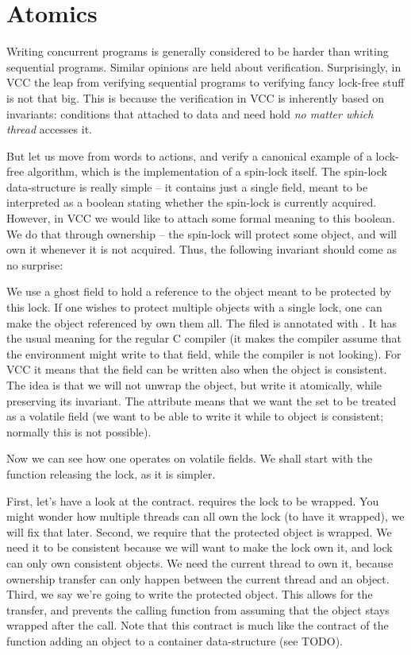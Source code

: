 \section{Atomics}

Writing concurrent programs is generally considered to be harder than writing
sequential programs.
Similar opinions are held about verification.
Surprisingly, in VCC the leap from verifying sequential programs to
verifying fancy lock-free stuff is not that big.
This is because the verification in VCC is inherently based on invariants:
conditions that attached to data and need hold \emph{no matter which thread}
accesses it.

But let us move from words to actions, and verify a canonical example
of a lock-free algorithm, which is the implementation of a spin-lock itself.
The spin-lock data-structure is really simple -- it contains just a single
field, meant to be interpreted as a boolean stating whether the spin-lock
is currently acquired.
However, in VCC we would like to attach some formal meaning to this boolean.
We do that through ownership -- the spin-lock will protect some object,
and will own it whenever it is not acquired.
Thus, the following invariant should come as no surprise:


\noindent
We use a ghost field to hold a reference to the object meant to be protected
by this lock.
If one wishes to protect multiple objects with a single lock, one can make
the object referenced by  own them all.
The  filed is annotated with .
It has the usual meaning for the regular C compiler (\ie it makes the compiler
assume that the environment might write to that field, while the compiler
is not looking).
For VCC it means that the field can be written also when the object is
consistent.
The idea is that we will not unwrap the object, but write it atomically,
while preserving its invariant.
The attribute
 means that we want the \vcc{\owns} set
to be treated as a volatile field (\ie we want to be able to write
it while to object is consistent; normally this is not possible).

Now we can see how one operates on volatile fields.
We shall start with the function releasing the lock, as it is simpler.


\noindent
First, let's have a look at the contract.
 requires the lock to be wrapped.
You might wonder how multiple threads can all own the lock (to have it
wrapped), we will fix that later.
Second, we require that the protected object is wrapped.
We need it to be consistent because we will want to make the lock own it, and
lock can only own consistent objects.
We need the current thread to own it, because ownership transfer can
only happen between the current thread and an object.
Third, we say we're going to write the protected object.
This allows for the transfer, and prevents the calling function from assuming
that the object stays wrapped after the call.
Note that this contract is much like the contract of the function
adding an object to a container data-structure (see TODO).

